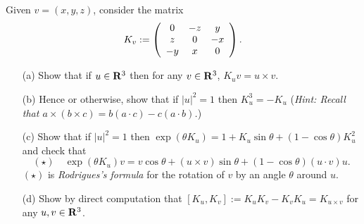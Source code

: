 \documentclass[12pt]{article}
\begin{document}
\begin{question}
Given $v=(x,y,z)$, consider the matrix
\[K_v:=\left(\begin{array}{ccc}0 & -z & y\\z & 0 & -x\\-y & x & 0\end{array}\right).\]
\begin{enumerate}
\item[(a)] Show that if $u\in\mathbf{R}^3$ then for any $v\in\mathbf{R}^3$, $K_uv=u\times v$.
\item[(b)] Hence or otherwise, show that if $|u|^2=1$ then $K_u^3=-K_u$ ({\em Hint: Recall that $a\times(b\times c)=b(a\cdot c)-c(a\cdot b)$.})
\item[(c)] Show that if $|u|^2=1$ then $\exp(\theta K_u)=1+K_u\sin\theta+(1-\cos\theta)K_u^2$ and check that
\[(\star)\quad \exp(\theta K_u)v=v\cos\theta+(u\times v)\sin\theta+(1-\cos\theta)(u\cdot v)u.\]
$(\star)$ is {\em Rodrigues's formula} for the rotation of $v$ by an angle $\theta$ around $u$.
\item[(d)] Show by direct computation that $[K_u,K_v]:=K_uK_v-K_vK_u=K_{u\times v}$ for any $u,v\in\mathbf{R}^3$.
\end{enumerate}
\end{question}
\bigskip

\iffalse
\begin{answer}
\begin{enumerate}[(a)]
\item If $u=(x,y,z)$ and $v=(a,b,c)$ then we have
\[K_uv=\matt{0}{-z}{y}{z}{0}{-x}{-y}{x}{0}\vect{a}{b}{c}=\vect{cy-bz}{az-cx}{bx-ay}=u\times v.\]
\item $K_u^3v=K_u^2(u\times v)=K_u(u\times(u\times v))=K_u(u(u\cdot v)-|u|^2v)=-K_uv$ since $K_uu=u\times u=0$ and $|u|^2=1$. Therefore $K_u^3=-K_u$.
\item \begin{align*}
\exp(\theta K_u)&=1+\sum_{n=1}^{\infty}\frac{\theta^n}{n!}K_u^n\\
                &=1+\sum_{n\equiv 1\mod 2}\frac{\theta^n}{n!}(-1)^{(n-1)/2}K_u+\sum_{n\equiv 0\mod 2}\frac{\theta^n}{n!}(-1)^{n/2+1}K_u^2\\
                &=1+K_u\sin\theta+K_u^2(1-\cos\theta)
\end{align*}
Equation $(\star)$ now follows immediately from this formula, the fact that $K_uv=u\times v$ and the formula $u\times (u\times v)=(u\cdot v)u-v$ (using $|u|^2=1$)
\item We have
\begin{align*}
K_uK_vw-K_vK_uw&=u\times(v\times w)-v\times (u\times w)\\
              &=(u\cdot w)v-(u\cdot v)w-(v\cdot w)u+(u\cdot v)w\\
              &=(u\cdot w)v-(v\cdot w)u\\
              &=(u\times v)\times v\\
              &=K_{u\times v}w.
\end{align*}
\end{enumerate}
\end{answer}
\fi
\end{document}
